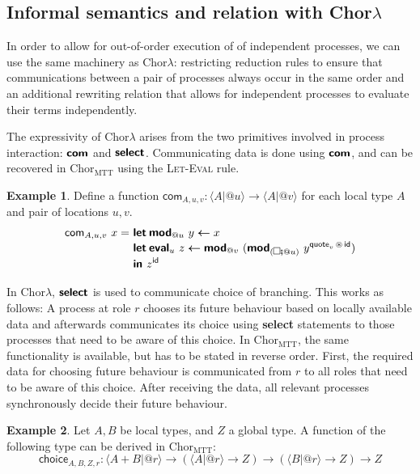 \documentclass{scrartcl}
\theoremstyle{definition}
\newtheorem{example}{Example}
\theoremstyle{plain}
\renewcommand{\square}%
  {\tikz{\draw (0,0) rectangle (0.2cm,0.2cm);}}
\newcommand{\primitive}[1]{\textsf{\textbf{#1}}}
\newcommand{\ChorMTT}{Chor${}_{\textrm{MTT}}$}
\begin{document}
\subsection{Informal semantics and relation with
  \texorpdfstring{Chor$\lambda$}{ChorLambda}}
In order to allow for out-of-order execution of of independent processes, we
can use the same machinery as Chor$\lambda$: restricting reduction rules to
ensure that communications between a pair of processes always occur in the same
order and an additional rewriting relation that allows for independent
processes to evaluate their terms independently.

The expressivity of Chor$\lambda$ arises from the two primitives involved in
process interaction: $\primitive{com}$ and $\primitive{select}$. Communicating
data is done using $\primitive{com}$, and can be recovered in \ChorMTT{} using
the \textsc{Let-Eval} rule.
\begin{example}
  Define a function $\textsf{com}_{A,u,v} : \langle A | @u
  \rangle \to \langle A | @v \rangle$ for each local type $A$ and pair of
  locations $u,v$.
  \begin{align*}
    \textsf{com}_{A,u,v}\ x =
    \ & \primitive{let}\:\primitive{mod}_{@u}\ y \bm{\leftarrow} x\\[-3pt]
      & \primitive{let}\:\primitive{eval}_u\ z \bm{\leftarrow} \primitive{mod}_{@v}\ (\primitive{mod}_{(\square \fatsemi @u)}\ 
        y^{\textsf{quote}_v \,\circledast\, \textsf{id}})\\[-3pt]
      & \primitive{in } z^{\textsf{id}}
  \end{align*}
\end{example}
In Chor$\lambda$, $\primitive{select}$ is used to communicate choice of
branching. This works as follows: A process at role $r$ chooses its future
behaviour based on locally available data and afterwards communicates its
choice using \primitive{select} statements to those processes that need to be
aware of this choice. In \ChorMTT{}, the same functionality is available, but
has to be stated in reverse order. First, the required data for choosing future
behaviour is communicated from $r$ to all roles that need to be aware of this
choice. After receiving the data, all relevant processes synchronously decide
their future behaviour.
\begin{example}
  Let $A, B$ be local types, and $Z$ a global type. A function of the following
  type can be derived in \ChorMTT:
  \[
    \textsf{choice}_{A,B,Z,r} : \langle A + B | @r \rangle
    \to (\langle A | @r \rangle \to Z)
    \to (\langle B | @r \rangle \to Z)
    \to Z
  \]
\end{example}
\end{document}
